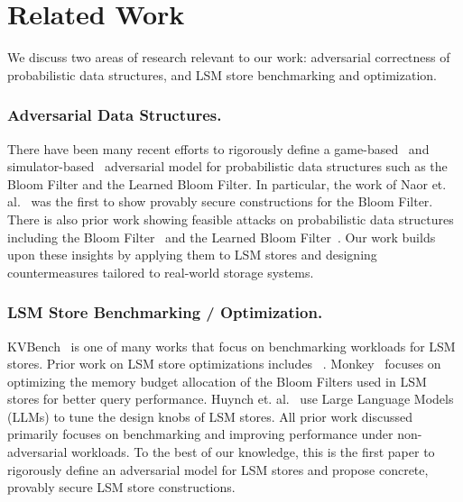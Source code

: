 \section{Related Work}
We discuss two areas of research relevant to our work: adversarial correctness of probabilistic data structures, and LSM store benchmarking and optimization.

\subsubsection*{Adversarial Data Structures.} There have been many recent efforts to rigorously define a game-based~\cite{naor_eylon,naor_oved,hayder_2024,clayton_2019} and simulator-based~\cite{filic_2022,filic_2024,hayder_2025} adversarial model for probabilistic data structures such as the Bloom Filter and the Learned Bloom Filter. In particular, the work of Naor et. al.~\cite{naor_eylon,naor_oved} was the first to show provably secure constructions for the Bloom Filter. There is also prior work showing feasible attacks on probabilistic data structures including the Bloom Filter~\cite{gerbet_2015} and the Learned Bloom Filter~\cite{reviriego_2021}. 
Our work builds upon these insights by applying them to LSM stores and designing countermeasures tailored to real-world storage systems. 

\subsubsection*{LSM Store Benchmarking / Optimization.} KVBench~\cite{zhu_et_al_2024} is one of many works that focus on benchmarking workloads for LSM stores. Prior work on LSM store optimizations includes ~\cite{monkey,thakkar_2024,spooky,huynh_et_al_2022}. Monkey~\cite{monkey} focuses on optimizing the memory budget allocation of the Bloom Filters used in LSM stores for better query performance. Huynch et. al.~\cite{huynh_et_al_2022} use Large Language Models (LLMs) to tune the design knobs of LSM stores. All prior work discussed primarily focuses on benchmarking and improving performance under non-adversarial workloads. To the best of our knowledge, this is the first paper to rigorously define an adversarial model for LSM stores and propose concrete, provably secure LSM store constructions.